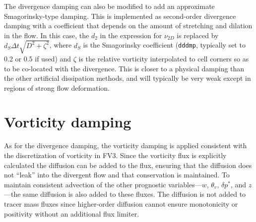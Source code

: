 \documentclass[10pt,letterpaper,margin=1in]{memoir}
\newcommand{\redtext}[1]{\textcolor{red}{[#1]}}  %
\begin{document}
The divergence damping can also be modified to add an approximate Smagorinsky-type damping. This is implemented as second-order divergence damping with a coefficient that depends on the amount of stretching and dilation in the flow. In this case, the $d_2$ in the expression for $\nu_{2D}$ is replaced by $d_S \Delta t \sqrt{D^2 + \zeta^2}$, where $d_S$ is the Smag\-orinsky coefficient (\texttt{dddmp}, typically set to 0.2 or 0.5 if used) and $\zeta$ is the relative vorticity interpolated to cell corners so as to be co-located with the divergence. This is closer to a physical damping than the other artificial dissipation methods, and will typically be very weak except in regions of strong flow deformation.


\section{Vorticity damping} \label{sec:vortdamp}

As for the divergence damping, the vorticity damping is applied consistent with the discretization of vorticity in FV3. Since the vorticity flux is explicitly calculated the diffusion can be added to the flux, ensuring that the diffusion does not ``leak'' into the divergent flow and that conservation is maintained. To maintain consistent advection of the other prognostic variables---$w$, $\theta_v$, $\delta p^*$, and $z$---the same diffusion is also added to these fluxes. The diffusion is not added to tracer mass fluxes since higher-order diffusion cannot ensure monotonicity or positivity without an additional flux limiter. 


\end{document}
